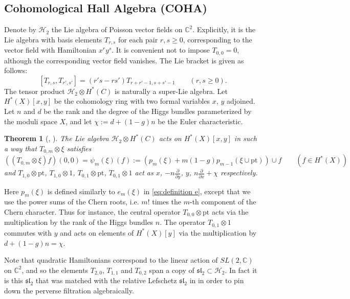 \documentclass[12pt]{amsart}
\newtheorem{theorem}{Theorem}[section]
\theoremstyle{definition}
\theoremstyle{remark}
\numberwithin{equation}{section}
\newcommand{\BC}{\mathbb C}
\begin{document}
	\subsection{Cohomological Hall Algebra (COHA)}
	Denote by $\mathscr{H}_2$ the Lie algebra of Poisson vector fields on $\mathbb{C}^2$. Explicitly, it is the Lie algebra with basis elements $T_{r,s}$ for each pair $r,s\geq 0$, corresponding to the vector field with Hamiltonian $x^r y^s$. It is convenient not to impose $T_{0,0}=0$, although the corresponding vector field vanishes. The Lie bracket is given as follows:
	\[
	[T_{r,s}, T_{r',s'}] = (r's - r s') T_{r+r'-1,s+s'-1}\qquad(r,s\geq 0).
	\]
	The tensor product $\mathscr{H}_2 \otimes H^*(C)$ is naturally a super-Lie algebra. Let $H^*(X)[x,y]$ be the cohomology ring with two formal variables $x$, $y$ adjoined. Let $n$ and $d$ be the rank and the degree of the Higgs bundles parameterized by the moduli space $X$, and let $\chi:=d + (1-g)n$ be the Euler characteristic.
	\begin{theorem}[\cite{hausel2022p}, \cite{mellit2023coherent}]
		The Lie algebra $\mathscr{H}_2 \otimes H^*(C)$ acts on $H^*(X)[x,y]$ in such a way that $T_{0,m}\otimes \xi$ satisfies 
		\[
		\left((T_{0,m}\otimes \xi) f\right)(0,0) = \psi_m(\xi)(f) := \left(p_m(\xi) + m(1-g) p_{m-1}(\xi\cup \mathrm{pt})\right)\cup f \qquad (f\in H^*(X))
		\]
		and $T_{1,0}\otimes \mathrm{pt}$, $T_{1,0}\otimes 1$, $T_{0,1}\otimes \mathrm{pt}$, $T_{0,1}\otimes 1$ act as $x$, $-n \frac{\partial}{\partial y}$, $y$, $n \frac{\partial}{\partial x} + \chi$ respectively.
	\end{theorem}
	Here $p_m(\xi)$ is defined similarly to $e_m(\xi)$ in \eqref{eq:definition e}, except that we use the power sums of the Chern roots, i.e. $m!$ times the $m$-th component of the Chern character. Thus for instance, the central operator $T_{0,0}\otimes\mathrm{pt}$ acts via the multiplication by the rank of the Higgs bundles $n$. The operator $T_{0,1}\otimes\mathrm{1}$ commutes with $y$ and acts on elements of $H^*(X)[y]$ via the multiplication by $d+(1-g)n = \chi$.
	
	
	Note that quadratic Hamiltonians correspond to the linear action of $SL(2,\BC)$ on $\BC^2$, and so the elements $T_{2,0}$, $T_{1,1}$ and $T_{0,2}$ span a copy of $\mathfrak{sl}_2\subset \mathscr{H}_2$. In fact it is this $\mathfrak{sl}_2$ that was matched with the relative Lefschetz $\mathfrak{sl}_2$ in \cite{hausel2022p} in order to pin down the perverse filtration algebraically.
	
\end{document}

